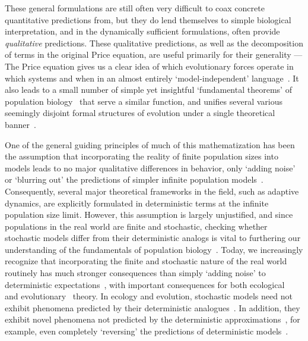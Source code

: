 These general formulations are still often very difficult to coax concrete quantitative predictions from, but they do lend themselves to simple biological interpretation, and in the dynamically sufficient formulations, often provide \emph{qualitative} predictions. These qualitative predictions, as well as the decomposition of terms in the original Price equation, are useful primarily for their generality --- The Price equation gives us a clear idea of which evolutionary forces operate in which systems and when in an almost entirely `model-independent' language~\citep{okasha_evolution_2006,frank_natural_2012,queller_fundamental_2017,luque_one_2017}. It also leads to a small number of simple yet insightful `fundamental theorems' of population biology~\citep{queller_fundamental_2017, lion_theoretical_2018, lehtonen_price_2018} that serve a similar function, and unifies several various seemingly disjoint formal structures of evolution under a single theoretical banner~\citep{ lehtonen_price_2020, luque_mirror_2021}.

One of the general guiding principles of much of this mathematization has been the assumption that incorporating the reality of finite population sizes into models leads to no major qualitative differences in behavior, only `adding noise' or `blurring out' the predictions of simpler infinite population models~\citep{page_unifying_2002}. Consequently, several major theoretical frameworks in the field, such as adaptive dynamics, are explicitly formulated in deterministic terms at the infinite population size limit. However, this assumption is largely unjustified, and since populations in the real world are finite and stochastic, checking whether stochastic models differ from their deterministic analogs is vital to furthering our understanding of the fundamentals of population biology~\citep{hastings_transients_2004, coulson_skeletons_2004, shoemaker_integrating_2020}. Today, we increasingly recognize that incorporating the finite and stochastic nature of the real world routinely has much stronger consequences than simply `adding noise' to deterministic expectations~\citep{boettiger_noise_2018}, with important consequences for both ecological~\citep{schreiber_does_2022} and evolutionary~\citep{delong_stochasticity_2023} theory. In ecology and evolution, stochastic models need not exhibit phenomena predicted by their deterministic analogues~\citep{proulx_what_2005, johansson_will_2006, claessen_delayed_2007,  wakano_evolutionary_2013, debarre_evolutionary_2016, johnson_two-dimensional_2021}. In addition, they exhibit novel phenomena not predicted by the deterministic approximations~\citep{rogers_demographic_2012, rogers_spontaneous_2012, rogers_modes_2015, veller_drift-induced_2017, delong_stochasticity_2023}, for example, even completely `reversing' the predictions of deterministic models~\citep{houchmandzadeh_selection_2012,houchmandzadeh_fluctuation_2015,constable_demographic_2016,mcleod_social_2019}.

